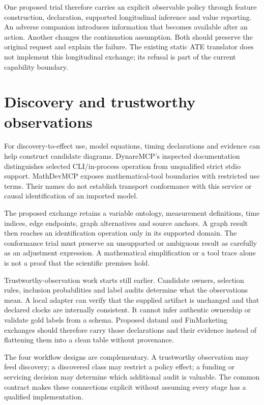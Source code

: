 One proposed trial therefore carries an explicit observable policy through
feature construction, declaration, supported longitudinal inference and value
reporting. An adverse companion introduces information that becomes available
after an action. Another changes the continuation assumption. Both should
preserve the original request and explain the failure. The existing static
ATE translator does not implement this longitudinal exchange; its refusal is
part of the current capability boundary.

\section{Discovery and trustworthy observations}

For discovery-to-effect use, model equations, timing declarations and evidence
can help construct candidate diagrams. DynareMCP's inspected documentation
distinguishes selected CLI/in-process operation from unqualified strict stdio
support. MathDevMCP exposes mathematical-tool boundaries with restricted use
terms.\cite{v12_in_inventory} Their names do not establish transport conformance
with this service or causal identification of an imported model.

The proposed exchange retains a variable ontology, measurement definitions,
time indices, edge endpoints, graph alternatives and source anchors. A graph
result then reaches an identification operation only in its supported domain.
The conformance trial must preserve an unsupported or ambiguous result as
carefully as an adjustment expression. A mathematical simplification or a
tool trace alone is not a proof that the scientific premises hold.

Trustworthy-observation work starts still earlier. Candidate owners, selection
rules, inclusion probabilities and label audits determine what the observations
mean. A local adapter can verify that the supplied artifact is unchanged and
that declared clocks are internally consistent. It cannot infer authentic
ownership or validate gold labels from a schema. Proposed dataml and
FinMarketing exchanges should therefore carry those declarations and their
evidence instead of flattening them into a clean table without provenance.

The four workflow designs are complementary. A trustworthy observation may
feed discovery; a discovered class may restrict a policy effect; a funding or
servicing decision may determine which additional audit is valuable. The
common contract makes these connections explicit without assuming every stage
has a qualified implementation.

